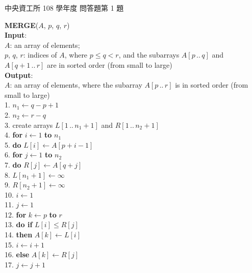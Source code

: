 \begin{pastexam}[label={px:ncu-108-dsa-13}]{中央資工所 108 學年度 問答題第 1 題}
\begin{small}
\textbf{MERGE}($A$, $p$, $q$, $r$)\\
\textbf{Input}:\\
\hspace*{1.5em}$A$: an array of elements;\\
\hspace*{1.5em}$p$, $q$, $r$: indices of $A$, where $p \le q < r$, and the subarrays $A[p \,..\, q]$
and $A[q+1 \,..\, r]$ are in sorted order (from small to large)\\
\textbf{Output}:\\
\hspace*{1.5em}$A$: an array of elements, where the subarray $A[p \,..\, r]$ is in sorted order
(from small to large)\\
1. $n_1 \leftarrow q - p + 1$\\
2. $n_2 \leftarrow r - q$\\
3. create arrays $L[1 \,..\, n_1+1]$ and $R[1 \,..\, n_2+1]$\\
4. \textbf{for} $i \leftarrow 1$ \textbf{to} $n_1$\\
5. \hspace*{1em}\textbf{do} $L[i] \leftarrow A[p+i-1]$\\
6. \textbf{for} $j \leftarrow 1$ \textbf{to} $n_2$\\
7. \hspace*{1em}\textbf{do} $R[j] \leftarrow A[q+j]$\\
8. $L[n_1+1] \leftarrow \infty$\\
9. $R[n_2+1] \leftarrow \infty$\\
10. $i \leftarrow 1$\\
11. $j \leftarrow 1$\\
12. \textbf{for} $k \leftarrow p$ \textbf{to} $r$\\
13. \hspace*{1em}\textbf{do if} $L[i] \le R[j]$\\
14. \hspace*{3em}\textbf{then} $A[k] \leftarrow L[i]$\\
15. \hspace*{5.2em}$i \leftarrow i+1$\\
16. \hspace*{3em}\textbf{else} $A[k] \leftarrow R[j]$\\
17. \hspace*{5.2em}$j \leftarrow j+1$
\end{small}
\end{pastexam}

